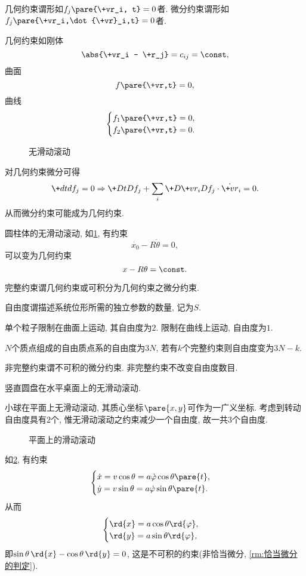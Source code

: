 \documentclass{ctexart}
\begin{document}
几何约束谓形如$\displaystyle f_j\pare{\+vr_i, t} = 0$者. 微分约束谓形如$\displaystyle f_j\pare{\+vr_i,\dot{\+vr}_i,t} = 0$者.
\begin{ex}
    几何约束如刚体
    \[ \abs{\+vr_i - \+r_j} = c_{ij} = \const, \]
    曲面
    \[ f\pare{\+vr,t} = 0, \]
    曲线
    \[ \begin{cases}
        f_1\pare{\+vr,t} = 0,\\
        f_2\pare{\+vr,t} = 0.
    \end{cases} \]
\end{ex}
\begin{figure}[ht]
    \centering
    \caption{无滑动滚动}
    \label{fig:无滑动滚动}
\end{figure}
对几何约束微分可得
\[ \+dtd{f_j} = 0\Rightarrow \+DtD{f_j} + \sum_i \+D{\+vr_i}D{f_j}\cdot\dot{\+vr}_i = 0. \]
从而微分约束可能成为几何约束.
\begin{ex}
    圆柱体的无滑动滚动, 如\cref{fig:无滑动滚动}, 有约束
    \[ \dot{x_0} - R\dot{\theta} = 0, \]
    可以变为几何约束
    \[ x - R\theta = \const. \]
\end{ex}
\begin{definition}[完整约束]
    完整约束谓几何约束或可积分为几何约束之微分约束.
\end{definition}
\begin{definition}[自由度]
    自由度谓描述系统位形所需的独立参数的数量, 记为$S$.
\end{definition}
\begin{ex}
    单个粒子限制在曲面上运动, 其自由度为$2$. 限制在曲线上运动, 自由度为$1$.
\end{ex}
\begin{ex}
    $N$个质点组成的自由质点系的自由度为$3N$, 若有$k$个完整约束则自由度变为$3N-k$.
\end{ex}
非完整约束谓不可积的微分约束. 非完整约束不改变自由度数目.
\begin{ex}
    竖直圆盘在水平桌面上的无滑动滚动.
\end{ex}
\begin{ex}
    小球在平面上无滑动滚动, 其质心坐标$\pare{x,y}$可作为一广义坐标. 考虑到转动自由度具有$2$个, 惟无滑动滚动之约束减少一个自由度, 故一共$3$个自由度. 
\end{ex}
\begin{figure}[ht]
    \centering
    \caption{平面上的滑动滚动}
    \label{fig:平面上的无滑动滚动}
\end{figure}
\begin{ex}
    如\cref{fig:平面上的无滑动滚动}, 有约束
    \[ \begin{cases}
        \dot{x} = v\cos\theta = a\dot{\varphi} \cos\theta\pare{t},\\
        \dot{y} = v\sin\theta = a\dot{\varphi} \sin\theta\pare{t}.
    \end{cases} \]
    从而
    \[ \begin{cases}
        \rd{x} = a\cos\theta\rd{\varphi},\\
        \rd{y} = a\sin\theta \rd{\varphi},
    \end{cases} \]
    即$\sin\theta\,\rd{x} - \cos \theta\,\rd{y} = 0$, 这是不可积的约束(非恰当微分, \cref{rm:恰当微分的判定}).
\end{ex}
\end{document}
